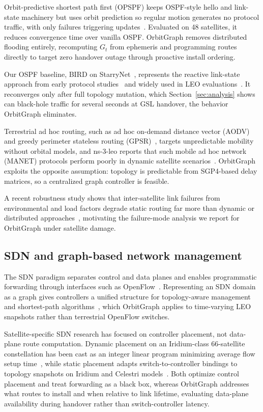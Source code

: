 Orbit-predictive shortest path first (OPSPF) keeps OSPF-style hello and
link-state machinery but uses orbit prediction so regular motion generates no
protocol traffic, with only failures triggering updates~\cite{pam:opspf:2019}.
Evaluated on 48 satellites, it reduces convergence time over vanilla OSPF.
OrbitGraph removes distributed flooding entirely, recomputing $G_t$ from
ephemeris and programming routes directly to target zero handover outage through
proactive install ordering.

Our OSPF baseline, BIRD on StarryNet~\cite{lai2023starrynet}, represents the
reactive link-state approach from early protocol studies~\cite{sidhu:ospf:1993}
and widely used in LEO evaluations~\cite{manzanareslopez2025comprehensive}.
It reconverges only after full topology mutation, which
Section~\ref{sec:analysis} shows can black-hole traffic for several seconds at
GSL handover, the behavior OrbitGraph eliminates.

Terrestrial ad hoc routing, such as ad hoc on-demand distance vector
(AODV)~\cite{perkins:aodv:1999} and greedy perimeter stateless routing
(GPSR)~\cite{karp:gpsr:2000}, targets unpredictable mobility without orbital
models, and ns-3-leo reports that such mobile ad hoc network (MANET) protocols
perform poorly in dynamic satellite scenarios~\cite{ns3leo2022}.
OrbitGraph exploits the opposite assumption: topology is predictable from
SGP4-based delay matrices, so a centralized graph controller is feasible.

A recent robustness study shows that inter-satellite link failures from
environmental and load factors degrade static routing far more than dynamic or
distributed approaches~\cite{yang:leo-routing-resilience:2025}, motivating the
failure-mode analysis we report for OrbitGraph under satellite damage.

\subsection{SDN and graph-based network management}

The SDN paradigm separates control and data planes and enables programmatic
forwarding through interfaces such as OpenFlow~\cite{10.1145/1355734.1355746}.
Representing an SDN domain as a graph gives controllers a unified structure for
topology-aware management and shortest-path algorithms~\cite{7014202}, which
OrbitGraph applies to time-varying LEO snapshots rather than terrestrial
OpenFlow switches.

Satellite-specific SDN research has focused on controller placement, not
data-plane route computation.
Dynamic placement on an Iridium-class 66-satellite constellation has been cast
as an integer linear program minimizing average flow setup
time~\cite{papa:sdn-cpp:2018}, while static placement adapts
switch-to-controller bindings to topology snapshots on Iridium and Celestri
models~\cite{guo:spda:2022}.
Both optimize control placement and treat forwarding as a black box, whereas
OrbitGraph addresses what routes to install and when relative to link lifetime,
evaluating data-plane availability during handover rather than switch-controller
latency.


